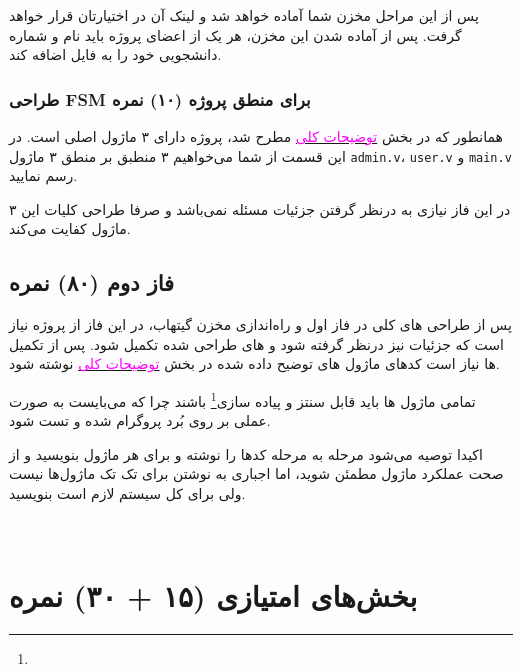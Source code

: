 \documentclass[]{article}
\begin{document}
پس از این مراحل مخزن شما آماده خواهد شد و لینک آن در اختیارتان قرار خواهد گرفت. پس از آماده شدن این مخزن، هر یک از اعضای پروژه باید نام و شماره دانشجویی خود را به فایل  اضافه کند.






\subsubsection*{{\titr طراحی FSM برای منطق پروژه} (۱۰) نمره}
\label{subsubsec:fsm}

همانطور که در بخش 
\hyperref[sec:detail]{\textcolor{magenta}{توضیحات کلی}}
مطرح شد، پروژه دارای ۳ ماژول اصلی است. در این قسمت از شما می‌خواهیم ۳  منطبق بر منطق ۳ ماژول \texttt{admin.v}، \texttt{user.v} و \texttt{main.v} رسم نمایید.

در این فاز نیازی به درنظر گرفتن جزئیات مسئله نمی‌باشد و صرفا طراحی کلیات این ۳ ماژول کفایت می‌کند.





\subsection*{{\titr فاز دوم} (۸۰) نمره}
پس از طراحی  های کلی در فاز اول و راه‌اندازی مخزن گیتهاب، در این فاز از پروژه نیاز است که جزئیات نیز درنظر گرفته شود و  های طراحی شده تکمیل شود. پس از تکمیل  ها نیاز است کدهای  ماژول های توضیح داده شده در بخش 
\hyperref[sec:detail]{\textcolor{magenta}{توضیحات کلی}}
نوشته شود. 

تمامی ماژول ها باید قابل سنتز و پیاده سازی\footnote{} باشند چرا که می‌بایست به صورت عملی بر روی بُرد پروگرام شده و تست شود.

اکیدا توصیه می‌شود مرحله به مرحله کد‌ها را نوشته و برای هر ماژول  بنویسید و از صحت عملکرد ماژول مطمئن شوید، اما اجباری به نوشتن  برای تک تک ماژول‌ها نیست ولی برای کل سیستم لازم است  بنویسید.



\newpage
\Large \textbf{\\
}



\section*{{\titr بخش‌های امتیازی} (۱۵ + ۳۰) نمره}
\end{document}
